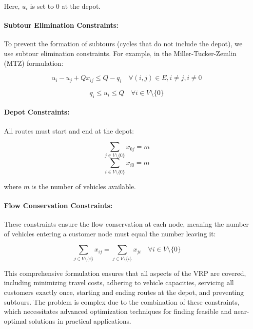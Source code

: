 \documentclass[
]{article}
\begin{document}
Here, \( u_i \) is set to 0 at the depot.

\paragraph{Subtour Elimination Constraints:}
To prevent the formation of subtours (cycles that do not include the depot), we use subtour elimination constraints. For example, in the Miller-Tucker-Zemlin (MTZ) formulation:

\begin{equation}
  u_i - u_j + Q x_{ij} \leq Q - q_i \quad \forall (i, j) \in E, i \neq j, i \neq 0
\end{equation}

\begin{equation}
  q_i \leq u_i \leq Q \quad \forall i \in V \setminus \{0\}
\end{equation}

\paragraph{Depot Constraints:}
All routes must start and end at the depot:

\begin{equation}
  \sum_{j \in V \setminus \{0\}} x_{0j} = m
\end{equation}
\begin{equation}
  \sum_{i \in V \setminus \{0\}} x_{i0} = m
\end{equation}

where \( m \) is the number of vehicles available.

\paragraph{Flow Conservation Constraints:}
These constraints ensure the flow conservation at each node, meaning the number of vehicles entering a customer node must equal the number leaving it:

\begin{equation}
  \sum_{j \in V \setminus \{i\}} x_{ij} = \sum_{j \in V \setminus \{i\}} x_{ji} \quad \forall i \in V \setminus \{0\}
\end{equation}

This comprehensive formulation ensures that all aspects of the VRP are covered, including minimizing travel costs, adhering to vehicle capacities, servicing all customers exactly once, starting and ending routes at the depot, and preventing subtours. The problem is complex due to the combination of these constraints, which necessitates advanced optimization techniques for finding feasible and near-optimal solutions in practical applications.
\end{document}
